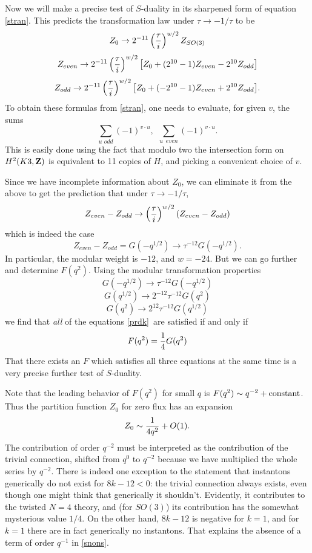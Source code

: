 \documentclass[12pt]{article}
\numberwithin{equation}{section}
\begin{document}
Now we will make a precise test of $S$-duality in its sharpened
form of equation \eqref{stran}.
This predicts the transformation law under $\tau\to -1/\tau$ to be
%
$$Z_{0}\rightarrow 2^{-11}\left({\tau \over i}\right)^{w/2} Z_{SO(3)}$$
$$Z_{even}\rightarrow 2^{-11}\left({\tau \over i}\right)^{w/2}\big[
  Z_{0}+(2^{10}-1)Z_{even}-
2^{10}Z_{odd} \big]$$
\begin{equation}
  \label{prdk}
  Z_{odd}\rightarrow 2^{-11}\left({\tau \over i}\right)^{w/2}\big[
  Z_{0}+(-2^{10}-1)Z_{even}+2^{10}Z_{odd}\big].
\end{equation}
%
To obtain these formulas from \eqref{stran}, one needs to evaluate, for given
$v$, the sums
\begin{equation}
  \label{runn}
  \sum_{u\,\,odd}(-1)^{v\cdot u},~~\sum_{u\,\,\,even}(-1)^{v\cdot u}.
\end{equation}
This is easily done using the fact that modulo two the
intersection form on $H^2(K3,{\bf Z})$ is equivalent to
11 copies of $H$, and picking a convenient choice of $v$.

Since we have incomplete information about $Z_{0}$,
we can eliminate it from the above to get the prediction that
under $\tau\to -1/\tau$,
%
$$Z_{even}-Z_{odd}\rightarrow \left({\tau \over
i}\right)^{w/2}(Z_{even}-Z_{odd})$$
%
which is indeed the case
%
$$Z_{even}-Z_{odd}=G(-q^{1/2})\rightarrow \tau^{-12}G(-q^{1/2}).$$
%
In particular, the modular weight is $-12$, and $w=-24$.
But we can go further and determine $F(q^2)$. Using the
modular transformation properties
%
$$G(-q^{1/2})\rightarrow \tau^{-12}G(-q^{1/2})$$
$$G(q^{1/2})\rightarrow 2^{-12} \tau^{-12}G(q^2)$$
$$G(q^{2})\rightarrow 2^{12} \tau^{-12}G(q^{1/2})$$
%
we find that {\it all} of the equations \eqref{prdk}\ are satisfied
if and only if
%
$$F(q^2)={1\over 4}G(q^2)$$
%
That there exists an $F$ which satisfies all three
equations at the same time is a very precise further test of
$S$-duality.

Note that the leading behavior of $F(q^2)$ for small $q$ is
$F(q^2)\sim q^{-2}+{\rm constant}$.
Thus the partition function $Z_0$ for zero flux has an expansion
\begin{equation}
  \label{snons}
  Z_0\sim {1\over 4q^2}+O(1).
\end{equation}
The contribution of order $q^{-2}$ must be interpreted as the contribution
of the trivial connection, shifted from $q^0$ to $q^{-2}$ because
we have multiplied the whole series by $q^{-2}$.  There is indeed
one exception to the statement that instantons generically do not
exist for $8k-12<0$: the trivial connection always exists, even though
one might think that generically it shouldn't.  Evidently, it contributes
to the twisted $N=4$ theory, and (for $SO(3)$) its contribution has the
somewhat mysterious value $1/4$.  On the other hand, $8k-12$ is
negative for $k=1$, and for $k=1$ there are in fact generically no instantons.
That explains the absence of a term of order $q^{-1}$ in \eqref{snons}.
\end{document}
